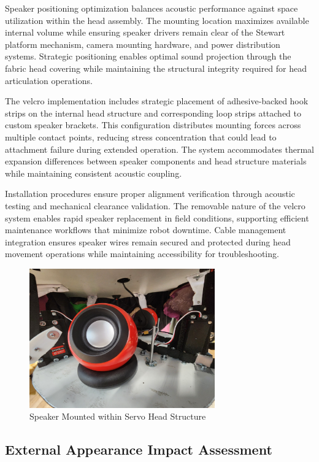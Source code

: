 Speaker positioning optimization balances acoustic performance against space utilization within the head assembly. The mounting location maximizes available internal volume while ensuring speaker drivers remain clear of the Stewart platform mechanism, camera mounting hardware, and power distribution systems. Strategic positioning enables optimal sound projection through the fabric head covering while maintaining the structural integrity required for head articulation operations.

The velcro implementation includes strategic placement of adhesive-backed hook strips on the internal head structure and corresponding loop strips attached to custom speaker brackets. This configuration distributes mounting forces across multiple contact points, reducing stress concentration that could lead to attachment failure during extended operation. The system accommodates thermal expansion differences between speaker components and head structure materials while maintaining consistent acoustic coupling.

Installation procedures ensure proper alignment verification through acoustic testing and mechanical clearance validation. The removable nature of the velcro system enables rapid speaker replacement in field conditions, supporting efficient maintenance workflows that minimize robot downtime. Cable management integration ensures speaker wires remain secured and protected during head movement operations while maintaining accessibility for troubleshooting.

\begin{figure}[H]
    \centering
    \includegraphics[height=6cm]{Images/SpeakerSetup (2).jpg}
    \caption{Speaker Mounted within Servo Head Structure}
    \label{fig:speaker_mount}
\end{figure}

\subsection{External Appearance Impact Assessment}

